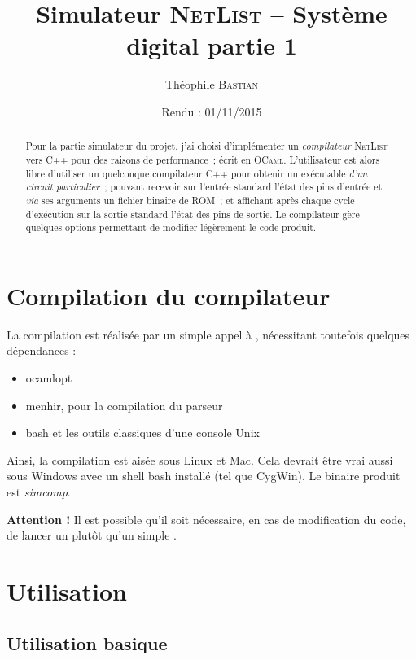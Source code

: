 \documentclass[11pt,a4paper]{article}
\title{Simulateur \textsc{NetList} -- Système digital partie 1}
\date{Rendu : 01/11/2015}
\author{Théophile \textsc{Bastian}}
\begin{document}
\maketitle

\begin{abstract}
Pour la partie \og simulateur \fg{} du projet, j'ai choisi d'implémenter un \emph{compilateur} \textsc{NetList} vers C++ pour des raisons de performance~; écrit en \textsc{OCaml}. L'utilisateur est alors libre d'utiliser un quelconque compilateur C++ pour obtenir un exécutable \emph{d'un circuit particulier}~; pouvant recevoir sur l'entrée standard l'état des pins d'entrée et \textit{via} ses arguments un fichier binaire de ROM~; et affichant après chaque cycle d'exécution sur la sortie standard l'état des pins de sortie. Le compilateur gère quelques options permettant de modifier légèrement le code produit.
\end{abstract}

\section{Compilation du compilateur}

La compilation est réalisée par un simple appel à , nécessitant toutefois quelques dépendances :
\begin{itemize}
\item ocamlopt
\item menhir, pour la compilation du parseur
\item bash et les outils classiques d'une console Unix
\end{itemize}

Ainsi, la compilation est aisée sous Linux et Mac. Cela devrait être vrai aussi sous Windows avec un shell bash installé (tel que CygWin). Le binaire produit est \emph{simcomp}.

\textbf{Attention !} Il est possible qu'il soit nécessaire, en cas de modification du code, de lancer un  plutôt qu'un simple .

\section{Utilisation}

\subsection{Utilisation basique}
\end{document}
